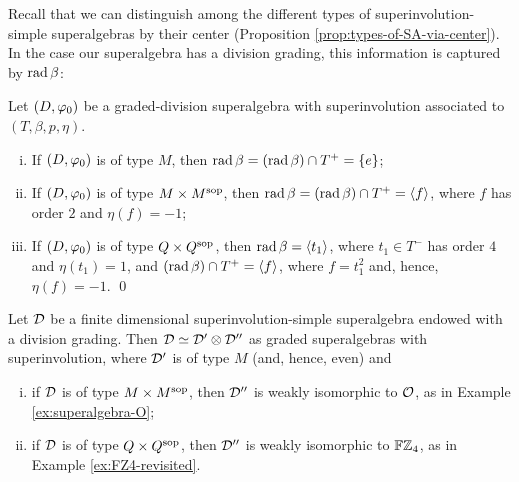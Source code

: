 Recall that we can distinguish among the different types of superinvolution-simple superalgebras by their center (Proposition \ref{prop:types-of-SA-via-center}).
In the case our superalgebra has a division grading, this information is captured by $\operatorname{rad} \beta$:

\begin{lemma}\label{lemma:types-of-D-via-rad-beta}
	Let $(D, \varphi_0)$ be a graded-division superalgebra with superinvolution associated to $(T, \beta, p, \eta)$.
	\begin{enumerate}[(i)]
		\item If $(D, \varphi_0)$ is of type $M$, then $\operatorname{rad} \beta = (\operatorname{rad} \beta) \cap T^+ = \{e\}$;
		\item If $(D, \varphi_0)$ is of type $M\times M^{\mathrm{sop}}$, then $\operatorname{rad} \beta = (\operatorname{rad} \beta) \cap T^+ = \langle f \rangle$, where $f$ has order $2$ and $\eta(f) = -1$;
		\item If $(D, \varphi_0)$ is of type $Q\times Q^{\mathrm{sop}}$, then $\operatorname{rad} \beta = \langle t_1 \rangle$, where $t_1 \in T^-$ has order $4$ and $\eta(t_1) = 1$, and $(\operatorname{rad} \beta) \cap T^+ = \langle f \rangle$, where $f = t_1^2$ and, hence, $\eta(f) = -1$. \qed
	\end{enumerate}
\end{lemma}

\begin{thm}
	Let $\mathcal{D}$ be a finite dimensional superinvolution-simple superalgebra endowed with a division grading.
	Then $\mathcal{D} \simeq \mathcal{D}' \otimes \mathcal{D}''$ as graded superalgebras with superinvolution, where $\mathcal{D}'$ is of type $M$ (and, hence, even) and
	\begin{enumerate}[(i)]
		\item if $\mathcal{D}$ is of type $M\times M^{\mathrm{sop}}$, then $\mathcal{D}''$ is weakly isomorphic to $\mathcal O$, as in Example \ref{ex:superalgebra-O};
		\item if $\mathcal{D}$ is of type $Q\times Q^{\mathrm{sop}}$, then $\mathcal{D}''$ is weakly isomorphic to $\mathbb{F}\mathbb{Z}_4$, as in Example \ref{ex:FZ4-revisited}.
	\end{enumerate}
\end{thm}

